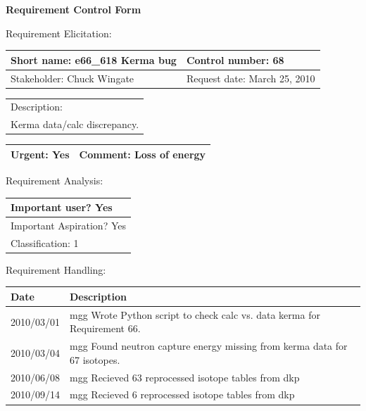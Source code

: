 \begin{center}\Large\bf
Requirement Control Form
\end{center}
\vspace{24pt}

Requirement Elicitation:

\begin{tabular}{|p{211pt}|p{211pt}|} \hline
Short name: e66\_618 Kerma bug & Control number: 68\\ \hline
Stakeholder: Chuck Wingate & Request date: March 25, 2010\\
\end{tabular}
\begin{tabular}{|p{433pt}|} \hline
Description: \\ 
Kerma data/calc discrepancy.
\\ \hline
\end{tabular} 
\begin{tabular}{|p{211pt}|p{211pt}|} \hline
Urgent: Yes & Comment: Loss of energy
\\ \hline
\end{tabular}

\vspace{24pt}

Requirement Analysis:

\begin{tabular}{|p{433pt}|} \hline
Important user? Yes \\ \hline
Important Aspiration? Yes \\ \hline
Classification: 1 \\ \hline
\end{tabular}
\vspace{24pt}

Requirement Handling:

\begin{tabular}{|p{72pt}|p{351pt}|} \hline
Date & Description \\ \hline
2010/03/01 & mgg Wrote Python script to check calc vs. data kerma for
Requirement 66. \\ \hline
2010/03/04 & mgg Found neutron capture energy missing from kerma data
for 67 isotopes. \\ \hline
2010/06/08 & mgg Recieved 63 reprocessed isotope tables from dkp \\
\hline
2010/09/14 & mgg Recieved 6 reprocessed isotope tables from dkp \\ \hline
\end{tabular}
